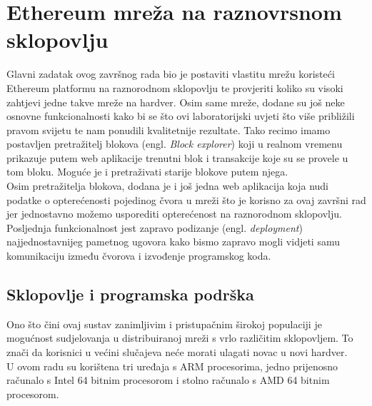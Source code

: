 \documentclass[times, utf8, zavrsni]{fer}
\begin{document}
\chapter{Ethereum mreža na raznovrsnom sklopovlju}
Glavni zadatak ovog završnog rada bio je postaviti vlastitu mrežu koristeći Ethereum platformu na raznorodnom sklopovlju
te provjeriti koliko su visoki zahtjevi jedne takve mreže na hardver. Osim same mreže, dodane su još neke osnovne funkcionalnosti
kako bi se što ovi laboratorijski uvjeti što više približili pravom svijetu te nam ponudili kvalitetnije rezultate. Tako recimo
imamo postavljen pretražitelj blokova (engl. \emph{Block explorer}) koji u realnom vremenu prikazuje putem web aplikacije
trenutni blok i transakcije koje su se provele u tom bloku. Moguće je i pretraživati starije blokove putem njega. \\
Osim pretražitelja blokova, dodana je i još jedna web aplikacija koja nudi podatke o opterećenosti pojedinog čvora u mreži
što je korisno za ovaj završni rad jer jednostavno možemo usporediti opterećenost na raznorodnom sklopovlju. \\
Posljednja funkcionalnost jest zapravo podizanje (engl. \emph{deployment}) najjednostavnijeg pametnog ugovora kako bismo
zapravo mogli vidjeti samu komunikaciju između čvorova i izvođenje programskog koda.

\section{Sklopovlje i programska podrška}
Ono što čini ovaj sustav zanimljivim i pristupačnim širokoj populaciji je mogućnost sudjelovanja u distribuiranoj mreži s vrlo
različitim sklopovljem. To znači da korisnici u većini slučajeva neće morati ulagati novac u novi hardver.\\ U ovom radu su korištena
tri uređaja s ARM procesorima, jedno prijenosno računalo s Intel 64 bitnim procesorom i stolno računalo s AMD 64 bitnim procesorom.
\end{document}
